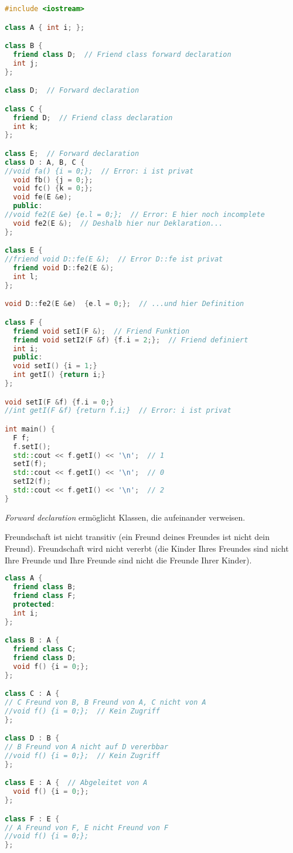 \begin{lstlisting}[language=C++]
#include <iostream>

class A { int i; };

class B {
  friend class D;  // Friend class forward declaration
  int j;
};

class D;  // Forward declaration

class C {
  friend D;  // Friend class declaration
  int k;
};

class E;  // Forward declaration
class D : A, B, C {
//void fa() {i = 0;};  // Error: i ist privat
  void fb() {j = 0;};
  void fc() {k = 0;};
  void fe(E &e);
  public:
//void fe2(E &e) {e.l = 0;};  // Error: E hier noch incomplete
  void fe2(E &);  // Deshalb hier nur Deklaration...
};

class E {
//friend void D::fe(E &);  // Error D::fe ist privat
  friend void D::fe2(E &);
  int l;
};

void D::fe2(E &e)  {e.l = 0;};  // ...und hier Definition

class F {
  friend void setI(F &);  // Friend Funktion
  friend void setI2(F &f) {f.i = 2;};  // Friend definiert
  int i;
  public:
  void setI() {i = 1;}
  int getI() {return i;}
};

void setI(F &f) {f.i = 0;}
//int getI(F &f) {return f.i;}  // Error: i ist privat

int main() {
  F f;
  f.setI();
  std::cout << f.getI() << '\n';  // 1
  setI(f);
  std::cout << f.getI() << '\n';  // 0
  setI2(f);
  std::cout << f.getI() << '\n';  // 2
}
\end{lstlisting}

\emph{Forward declaration} ermöglicht Klassen, die aufeinander verweisen.

Freundschaft ist nicht transitiv (ein Freund deines Freundes ist nicht dein
Freund). Freundschaft wird nicht vererbt (die Kinder Ihres Freundes sind nicht
Ihre Freunde und Ihre Freunde sind nicht die Freunde Ihrer Kinder).

\begin{lstlisting}[language=C++]
class A {
  friend class B;
  friend class F;
  protected:
  int i;
};

class B : A {
  friend class C;
  friend class D;
  void f() {i = 0;};
};

class C : A {
// C Freund von B, B Freund von A, C nicht von A
//void f() {i = 0;};  // Kein Zugriff
};

class D : B {
// B Freund von A nicht auf D vererbbar
//void f() {i = 0;};  // Kein Zugriff
};

class E : A {  // Abgeleitet von A
  void f() {i = 0;};
};

class F : E {
// A Freund von F, E nicht Freund von F
//void f() {i = 0;};
};
\end{lstlisting}

